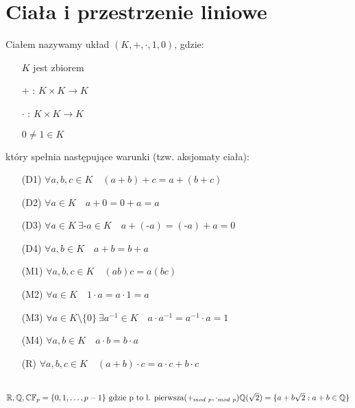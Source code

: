 
\section{Ciała i przestrzenie liniowe}

\begin{df}
Ciałem nazywamy układ $(K, + ,\cdot,1,0)$, gdzie:
    \begin{itemize}
        \item[] $K$ jest zbiorem
        \item[$+$]: $K \times K \rightarrow K$
        \item[$\cdot$]: $K \times K \rightarrow K$
        \item[] $0 \neq 1 \in K$
    \end{itemize}
    który spełnia następujące warunki (tzw. aksjomaty ciała):
    \begin{itemize}
        \item[(D1)] $\forall a, b, c \in K  \quad (a+b)+c = a+(b+c)$
        \item[(D2)] $\forall a \in K \quad a+0 = 0+a = a$
        \item[(D3)] $\forall a \in K \ \exists \text{-}a \in K \quad a + (\text{-}a) = (\text{-}a) + a = 0$
        \item[(D4)] $\forall a, b \in K \quad a+b = b+a$
        \item[(M1)] $\forall a, b, c \in K \quad (ab)c = a(bc) $
        \item[(M2)] $\forall a \in K \quad 1\cdot a = a\cdot 1 = a$
        \item[(M3)] $\forall a \in K \setminus \{0\} \ \exists a^{-1} \in K \quad a\cdot a^{-1} = a^{-1}\cdot a = 1$
        \item[(M4)] $\forall a, b \in K \quad a\cdot b = b\cdot a$
        \item[(R)] $ \forall a,b, c \in K \quad (a+b)\cdot c = a\cdot c + b\cdot c $
    \end{itemize}
\end{df}

\begin{przy}
    ~\\
    $ \mathbb{R}, \mathbb{Q}, \mathbb{C} \\
    \mathbb{F}_p = \{0, 1, \dots, p-1\} \text{ gdzie p to l. pierwsza} (+_{mod\ p}, \cdot_{mod\ p})\\
    \mathbb{Q}(\sqrt{2}) = \{a+b\sqrt{2} : a+b \in \mathbb{Q}\}$
\end{przy}

